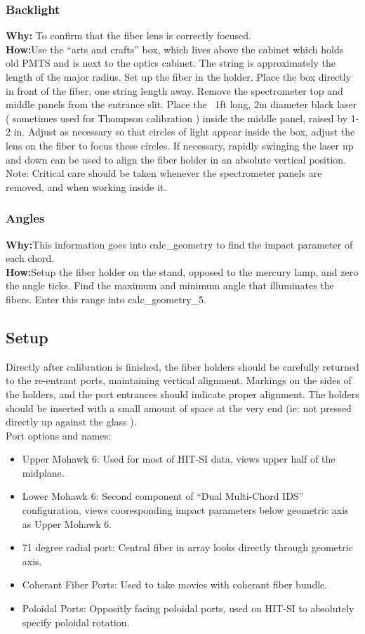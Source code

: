 \documentclass[twoside]{article}
\begin{document}
\subsubsection{Backlight}
\hspace{4ex}\textbf{Why:} To confirm that the fiber lens is correctly focused.\\
\hspace*{4ex}\textbf{How:}Use the “arts and crafts” box, which lives above the cabinet which holds old PMTS and is next to the optics cabinet. The string is approximately the length of the major radius. Set up the fiber in the holder. Place the box directly in front of the fiber, one string length away. Remove the spectrometer top and middle  panels from the entrance slit. Place the ~1ft long, 2in diameter black laser ( sometimes used for Thompson calibration ) inside the middle panel, raised by 1-2 in. Adjust as necessary so that circles of light appear inside the box, adjust the lens on the fiber to focus these circles. If necessary, rapidly swinging the laser up and down can be used to align the fiber holder in an absolute vertical position. 
Note: Critical care should be taken whenever the spectrometer panels are removed, and when working inside it. 
\subsubsection{Angles}
\hspace{4ex}\textbf{Why:}This information goes into calc\_geometry to find the impact parameter of each chord.\\
\hspace*{4ex}\textbf{How:}Setup the fiber holder on the stand, opposed to the mercury lamp, and zero the angle ticks. Find the maximum and minimum angle that illuminates the fibers. Enter this range into calc\_geometry\_5.
\subsection{Setup}
\hspace{4ex}Directly after calibration is finished, the fiber holders should be carefully returned to the re-entrant ports, maintaining vertical alignment. Markings on the sides of the holders, and the port entrances should indicate proper alignment. The holders should be inserted with a small amount of space at the very end (ie: not pressed directly up against the glass ).\\
Port options and names:
\begin{itemize}
	\item Upper Mohawk 6: Used for most of HIT-SI data, views upper half of the midplane.
	\item Lower Mohawk 6: Second component of ``Dual Multi-Chord IDS'' configuration, views cooresponding impact parameters below geometric axis as Upper Mohawk 6.
	\item 71 degree radial port: Central fiber in array looks directly through geometric axis.
	\item Coherant Fiber Ports: Used to take movies with coherant fiber bundle.
	\item Poloidal Ports: Oppositly facing poloidal ports, used on HIT-SI to absolutely specify poloidal rotation.
\end{itemize}
\end{document}
